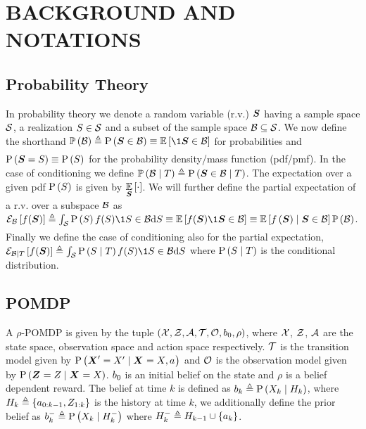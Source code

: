 \section{BACKGROUND AND NOTATIONS}

\subsection{Probability Theory}
In probability theory we denote a random variable (r.v.) $\boldsymbol S$ having a sample space $\mathcal S$, a realization $S\in\mathcal S$ and a subset of the sample space $\mathcal B\subseteq\mathcal S$. We now define the shorthand $\measure{\subSpace}\triangleq\prob{\RV\in\subSpace}\equiv\expectation{\1{\RV\in \subSpace}}{}$ for probabilities and $\mathrm{P}\left({\boldsymbol S=S}\right)\equiv\mathrm{P}\left({S}\right)$ for the probability density/mass function (pdf/pmf). In the case of conditioning we define $\mathbb{P}\left({\mathcal B\mid T}\right)\triangleq\mathrm{P}\left({\boldsymbol S\in\mathcal B\mid T}\right)$. The expectation over a given pdf $\mathrm{P}\left({S}\right)$ is given by $\operatorname*{\mathbb{E}}\limits_{\boldsymbol S}\left[{\cdot}\right]$. We will further define the partial expectation of a r.v. over a subspace $\mathcal B$ as
$\partialexpectation{f(\RV)}{\subSpace}\triangleq\int_\Space \prob{\variable}f(\variable)\1{\variable\in\subSpace}\D\variable\equiv\expectation{f(\RV)\1{\RV\in\subSpace}}{}\equiv\expectation{f\left(\RV\right)\mid\RV\in\subSpace}{}\measure{\subSpace}$. Finally we define the case of conditioning also for the partial expectation, $\partialexpectation{f(\RV)}{\subSpace\mid\variableI}\triangleq\int_\Space \prob{\variable\mid\variableI}f(\variable)\1{\variable\in\subSpace}\D\variable$ where $\mathrm{P}\left({S\mid T}\right)$ is the conditional distribution.

\subsection{POMDP}
A $\rho$-POMDP is given by the tuple $(\mathcal X,\mathcal Z,\mathcal A,\mathcal T,\mathcal O,b_{0},\rho)$, where $\mathcal X$, $\mathcal Z$, $\mathcal A$ are the state space, observation space and action space respectively. $\mathcal T$ is the transition model given by $\probcond{\statesRV{}^\prime=\states{}^\prime}{\statesRV{}=\states{},\action{}}$ and $\mathcal O$ is the observation model given by $\probcond{\observationsRV{}=\observations{}}{\statesRV{}=\states{}}$. $b_{0}$ is an initial belief on the state and $\rho$ is a belief dependent reward. The belief at time $k$ is defined as $b_{k}\triangleq\mathrm{P}\left({X_{k}}\mid{\ensuremath{H_{k}}}\right)$, where $H_{k}\triangleq\{{a_{0:k-1}},Z_{1:k}\}$ is the history at time $k$, we additionally define the prior belief as $b_{k}^-\triangleq\mathrm{P}\left({X_{k}}\mid{\ensuremath{H_{k}^-}}\right)$ where $H_{k}^-\triangleq H_{k-1}\cup\{{a_{k}}\}$.


